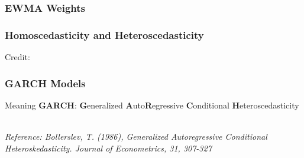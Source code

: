 \documentclass{beamer}
\begin{document}
\begin{frame}
  \frametitle{EWMA Weights}
\end{frame}


\begin{frame}
  \frametitle{Homoscedasticity and Heteroscedasticity}
  \hspace*{15pt}\hbox{\scriptsize Credit:}          
\end{frame}

\begin{frame}
  \frametitle{GARCH Models}

  \begin{alertblock}{Meaning}
    \textbf{GARCH}: \textbf{G}eneralized \textbf{A}uto\textbf{R}egressive \textbf{C}onditional \textbf{H}eteroscedasticity    \    
  \end{alertblock}

\medskip
  
\emph{Reference: Bollerslev, T. (1986), Generalized Autoregressive Conditional Heteroskedasticity. Journal of
  Econometrics, 31, 307-327}\\

\end{frame}
\end{document}
